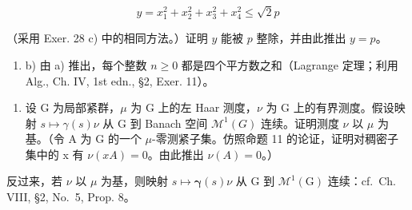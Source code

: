 \[
y = x _ {1} ^ {2} + x _ {2} ^ {2} + x _ {3} ^ {2} + x _ {4} ^ {2} \leqslant \sqrt {2} p
\]

（采用 Exer. 28 c) 中的相同方法。）证明 \(y\) 能被 \(p\) 整除，并由此推出 \(y = p\)。

\begin{enumerate}
\def\labelenumi{\alph{enumi})}
\setcounter{enumi}{1}
\tightlist
\item
  b) 由 a) 推出，每个整数 \(n \geqslant 0\) 都是四个平方数之和（Lagrange 定理；利用 Alg., Ch. IV, 1st edn., §2, Exer. 11）。
\end{enumerate}

\begin{enumerate}
\def\labelenumi{\arabic{enumi})}
\setcounter{enumi}{29}
\tightlist
\item
  设 G 为局部紧群，\(\mu\) 为 G 上的左 Haar 测度，\(\nu\) 为 G 上的有界测度。假设映射 \(s \mapsto \gamma(s)\nu\) 从 G 到 Banach 空间 \(\mathcal{M}^{1}(G)\) 连续。证明测度 \(\nu\) 以 \(\mu\) 为基。（令 A 为 G 的一个 \(\mu\)-零测紧子集。仿照命题 11 的论证，证明对稠密子集中的 x 有 \(\nu(xA)=0\)。由此推出 \(\nu(A)=0\)。）
\end{enumerate}

反过来，若 \(\nu\) 以 \(\mu\) 为基，则映射 \(s \mapsto \pmb{\gamma}(s)\nu\) 从 G 到 \(\mathcal{M}^1(\mathrm{G})\) 连续：cf.~Ch. VIII, §2, No.~5, Prop. 8。
